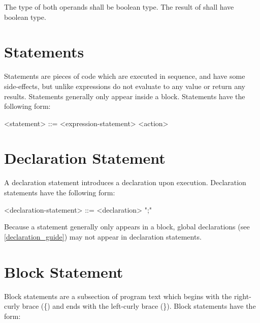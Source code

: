 The type of both operands shall be boolean type. The result of shall have boolean type.

\section{Statements} \label{statements_guide}

Statements are pieces of code which are executed in sequence, and have some side-effects, but unlike expressions do not evaluate to any value or return any results. Statements generally only appear inside a block. Statements have the following form:

\begin{minip}
\begin{grammar}
<statement> ::=
<expression-statement>
\alt <action>
\end{grammar}
\end{minip}

\section{Declaration Statement} \label{decl_stmt_guide}

A declaration statement introduces a declaration upon execution. Declaration statements have the following form:

\begin{minip}
\begin{grammar}
<declaration-statement> ::=
<declaration> ";"
\end{grammar}
\end{minip}

Because a statement generally only appears in a block, global declarations (see \ref{declaration_guide}) may not appear in declaration statements. 

\section{Block Statement} \label{block_stmt_guide}

Block statements are a subsection of program text which begins with the right-curly brace (\{) and ends with the left-curly brace (\}). Block statements have the form:


